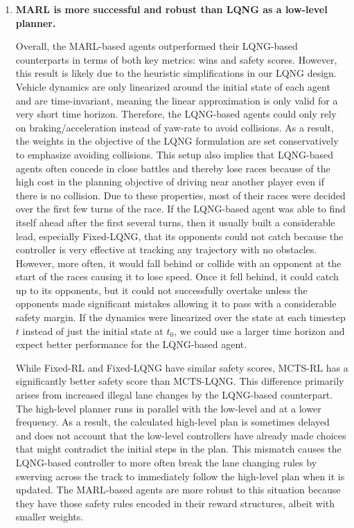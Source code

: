 \begin{enumerate}[wide, labelindent=0pt, font=\bfseries]
\item \textbf{MARL is more successful and robust than LQNG as a low-level planner.}  

Overall, the MARL-based agents outperformed their LQNG-based counterparts in terms of both key metrics: wins and safety scores. However, this result is likely due to the heuristic simplifications in our LQNG design. Vehicle dynamics are only linearized around the initial state of each agent and are time-invariant, meaning the linear approximation is only valid for a very short time horizon. Therefore, the LQNG-based agents could only rely on braking/acceleration instead of yaw-rate to avoid collisions. As a result, the weights in the objective of the LQNG formulation are set conservatively to emphasize avoiding collisions. This setup also implies that LQNG-based agents often concede in close battles and thereby lose races because of the high cost in the planning objective of driving near another player even if there is no collision. Due to these properties, most of their races were decided over the first few turns of the race. If the LQNG-based agent was able to find itself ahead after the first several turns, then it usually built a considerable lead, especially Fixed-LQNG, that its opponents could not catch because the controller is very effective at tracking any trajectory with no obstacles. However, more often, it would fall behind or collide with an opponent at the start of the races causing it to lose speed. Once it fell behind, it could catch up to its opponents, but it could not successfully overtake unless the opponents made significant mistakes allowing it to pass with a considerable safety margin. If the dynamics were linearized over the state at each timestep $t$ instead of just the initial state at $t_0$, we could use a larger time horizon and expect better performance for the LQNG-based agent. 

While Fixed-RL and Fixed-LQNG have similar safety scores, MCTS-RL has a significantly better safety score than MCTS-LQNG. This difference primarily arises from increased illegal lane changes by the LQNG-based counterpart. The high-level planner runs in parallel with the low-level and at a lower frequency. As a result, the calculated high-level plan is sometimes delayed and does not account that the low-level controllers have already made choices that might contradict the initial steps in the plan. This mismatch causes the LQNG-based controller to more often break the lane changing rules by swerving across the track to immediately follow the high-level plan when it is updated. The MARL-based agents are more robust to this situation because they have those safety rules encoded in their reward structures, albeit with smaller weights. 


\end{enumerate}
